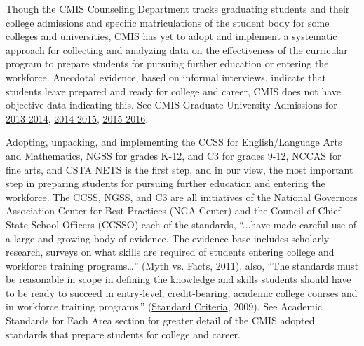 \documentclass{report}
\begin{document}
\begin{findings}
Though the CMIS Counseling Department tracks graduating students and their college admissions and specific matriculations of the student body for some colleges and universities, CMIS has yet to adopt and implement a systematic approach for collecting and analyzing data on the effectiveness of the curricular program to prepare students for pursuing further education or entering the workforce. Anecdotal evidence, based on informal interviews,  indicate that students leave prepared and ready for college and career, CMIS does not have objective data indicating this. See 
CMIS Graduate University Admissions for \href{https://docs.google.com/a/cmis.ac.th/document/d/1M7BROvkK3R77OdA72Ki5pvfYoB2icgE0Q3hEeFLE5T0/edit?usp=sharing}{2013-2014}, \href{https://docs.google.com/a/cmis.ac.th/document/d/1zw64gEZHVkJ_9B9-Gg3vSRzOMfmSo9-WBJLWPOm0DXI/edit?usp=sharing}{2014-2015}, \href{https://docs.google.com/a/cmis.ac.th/document/d/1HZgueYnVPvIi645E2ZaxqHpwtzVN9zyEyP8XcOibPyY/edit?usp=sharing}{2015-2016}. 


Adopting, unpacking, and implementing the CCSS for English/Language Arts and Mathematics, NGSS for grades K-12,  and C3 for grades 9-12, NCCAS for fine arts, and CSTA
NETS is the first step, and in our view, the most important step in preparing students for pursuing further education and entering the workforce. The CCSS, NGSS, and C3 are all initiatives of the  National Governors Association Center for Best Practices (NGA Center) and the Council of Chief State School Officers (CCSSO) each of the standards, “...have made careful use of a large and growing body of evidence. The evidence base includes scholarly research, surveys on what skills are required of students entering college and workforce training programs…” (Myth vs. Facts, 2011), also, “The standards must be reasonable in scope in defining the knowledge and skills students should have to be ready to succeed in entry-level, credit-bearing, academic college courses and in workforce training programs.” (\href{https://drive.google.com/drive/search?q=standards\%20criteria}{Standard Criteria}, 2009). See Academic Standards for Each Area section for greater detail of the CMIS adopted standards that prepare students for college and career. 



\end{findings}
\end{document}
